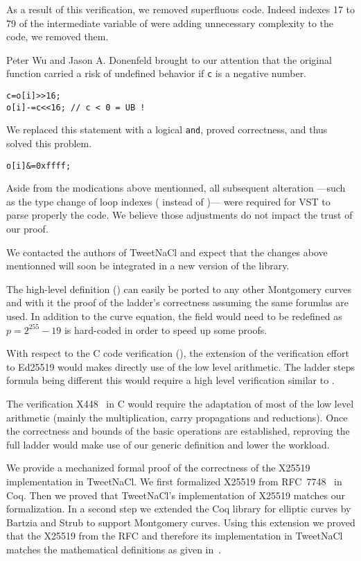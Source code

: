 
As a result of this verification, we removed superfluous code.
Indeed indexes 17 to 79 of the  intermediate variable of
 were adding unnecessary complexity to the code,
we removed them.

Peter Wu and Jason A. Donenfeld brought to our attention that the original
 function carried a risk of undefined behavior if \texttt{c}
is a negative number.
\begin{lstlisting}[language=Ctweetnacl]
c=o[i]>>16;
o[i]-=c<<16; // c < 0 = UB !
\end{lstlisting}
We replaced this statement with a logical \texttt{and}, proved correctness,
and thus solved this problem.
\begin{lstlisting}[language=Ctweetnacl]
o[i]&=0xffff;
\end{lstlisting}


Aside from the modications above mentionned, all subsequent alteration
---such as the type change of loop indexes ( instead of )---
were required for VST to parse properly the code. We believe those
adjustments do not impact the trust of our proof.

We contacted the authors of TweetNaCl and expect that the changes above
mentionned will soon be integrated in a new version of the library.

The high-level definition () can easily be ported to any
other Montgomery curves and with it the proof of the ladder's correctness
assuming the same forumlas are used.
In addition to the curve equation, the field  would need to be redefined
as $p=2^{255}-19$ is hard-coded in order to speed up some proofs.

With respect to the C code verification (), the extension of
the verification effort to Ed25519 would makes directly use of the low level
arithmetic. The ladder steps formula being different this would require a high
level verification similar to .

The verification \eg X448~\cite{cryptoeprint:2015:625,rfc7748} in C would
require the adaptation of most of the low level arithmetic (mainly the
multiplication, carry propagations and reductions).
Once the correctness and bounds of the basic operations are established,
reproving the full ladder would make use of our generic definition and lower
the workload.

We provide a mechanized formal proof of the correctness of the X25519
implementation in TweetNaCl.
We first formalized X25519 from RFC~7748~\cite{rfc7748} in Coq. Then we proved
that TweetNaCl's implementation of X25519 matches our formalization.
In a second step we extended the Coq library for elliptic curves \cite{BartziaS14}
by Bartzia and Strub to support Montgomery curves. Using this extension we
proved that the X25519 from the RFC and therefore its implementation in TweetNaCl matches
the mathematical definitions as given in~\cite[Sec.~2]{Ber06}.
